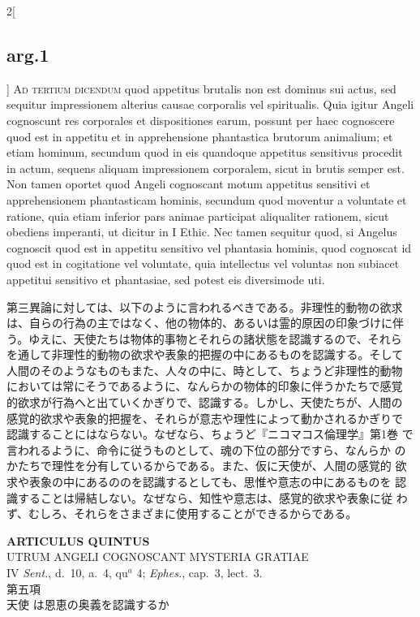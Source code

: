 \documentclass[paper=a4paper,fontsize=10pt,jafontsize=9pt,titlepage]{jlreq}
\begin{document}
\begin{paracol}{2}[\subsection{arg.1}]
{\scshape Ad tertium dicendum} quod appetitus brutalis non est dominus
sui actus, sed sequitur impressionem alterius causae corporalis vel
spiritualis. Quia igitur Angeli cognoscunt res corporales et
dispositiones earum, possunt per haec cognoscere quod est in appetitu
et in apprehensione phantastica brutorum animalium; et etiam hominum,
secundum quod in eis quandoque appetitus sensitivus procedit in actum,
sequens aliquam impressionem corporalem, sicut in brutis semper
est. Non tamen oportet quod Angeli cognoscant motum appetitus
sensitivi et apprehensionem phantasticam hominis, secundum quod
moventur a voluntate et ratione, quia etiam inferior pars animae
participat aliqualiter rationem, sicut obediens imperanti, ut dicitur
in I Ethic. Nec tamen sequitur quod, si Angelus cognoscit quod est in
appetitu sensitivo vel phantasia hominis, quod cognoscat id quod est
in cogitatione vel voluntate, quia intellectus vel voluntas non
subiacet appetitui sensitivo et phantasiae, sed potest eis diversimode
uti.

\switchcolumn

第三異論に対しては、以下のように言われるべきである。非理性的動物の欲求
は、自らの行為の主ではなく、他の物体的、あるいは霊的原因の印象づけに伴
う。ゆえに、天使たちは物体的事物とそれらの諸状態を認識するので、それら
を通して非理性的動物の欲求や表象的把握の中にあるものを認識する。そして
人間のそのようなものもまた、人々の中に、時として、ちょうど非理性的動物
においては常にそうであるように、なんらかの物体的印象に伴うかたちで感覚
的欲求が行為へと出ていくかぎりで、認識する。しかし、天使たちが、人間の
感覚的欲求や表象的把握を、それらが意志や理性によって動かされるかぎりで
認識することにはならない。なぜなら、ちょうど『ニコマコス倫理学』第1巻
で言われるように、命令に従うものとして、魂の下位の部分ですら、なんらか
のかたちで理性を分有しているからである。また、仮に天使が、人間の感覚的
欲求や表象の中にあるののを認識するとしても、思惟や意志の中にあるものを
認識することは帰結しない。なぜなら、知性や意志は、感覚的欲求や表象に従
わず、むしろ、それらをさまざまに使用することができるからである。

\end{paracol}
\newpage
{}
{}
\setcounter{section}{5}
\setcounter{subsection}{0}





\begin{center}
{\Large {\bfseries ARTICULUS QUINTUS}}\\ {\large UTRUM ANGELI COGNOSCANT
MYSTERIA GRATIAE}\\ {\footnotesize IV {\itshape Sent.}, d.~10, a.~4,
qu$^a$ 4; {\itshape Ephes.}, cap.~3, lect.~3.}\\ {\Large 第五項\\天使
は恩恵の奥義を認識するか}
\end{center}
\end{document}
